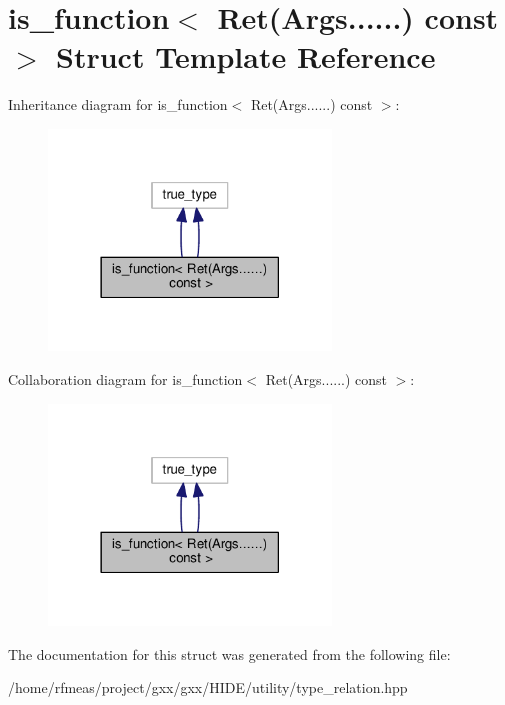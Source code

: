 \hypertarget{structis__function_3_01Ret_07Args_8_8_8_8_8_8_08_01const_01_01_4}{}\section{is\+\_\+function$<$ Ret(Args......) const $>$ Struct Template Reference}
\label{structis__function_3_01Ret_07Args_8_8_8_8_8_8_08_01const_01_01_4}


Inheritance diagram for is\+\_\+function$<$ Ret(Args......) const $>$\+:
\nopagebreak
\begin{figure}[H]
\begin{center}
\leavevmode
\includegraphics[width=213pt]{structis__function_3_01Ret_07Args_8_8_8_8_8_8_08_01const_01_01_4__inherit__graph}
\end{center}
\end{figure}


Collaboration diagram for is\+\_\+function$<$ Ret(Args......) const $>$\+:
\nopagebreak
\begin{figure}[H]
\begin{center}
\leavevmode
\includegraphics[width=213pt]{structis__function_3_01Ret_07Args_8_8_8_8_8_8_08_01const_01_01_4__coll__graph}
\end{center}
\end{figure}


The documentation for this struct was generated from the following file\+:\begin{DoxyCompactItemize}
\item 
/home/rfmeas/project/gxx/gxx/\+H\+I\+D\+E/utility/type\+\_\+relation.\+hpp\end{DoxyCompactItemize}
